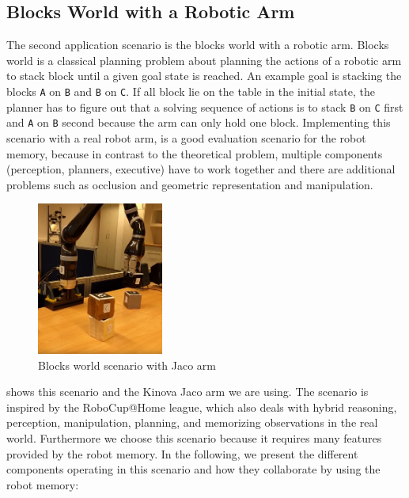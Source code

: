 \subsection{Blocks World with a Robotic Arm}
\label{sec:app-blocks-world}
The second application scenario is the blocks world with a robotic
arm. Blocks world is a classical planning problem about planning the
actions of a robotic arm to stack block until a given goal state is
reached. An example goal is stacking the blocks \texttt{A} on
\texttt{B} and \texttt{B} on \texttt{C}. If all block lie on the table in the initial
state, the planner has to figure out that a solving sequence of
actions is to stack \texttt{B} on \texttt{C} first and \texttt{A} on
\texttt{B} second because the arm can only hold one block.
Implementing this scenario with a real robot arm, is a good evaluation
scenario for the robot memory, because in contrast to the theoretical
problem, multiple components (perception, planners, executive)
have to work together and there are additional problems such as
occlusion and geometric representation and manipulation.
\begin{figure}
  \centering
  \includegraphics[width=0.37\textwidth]{img/blocks-world}%
  \caption[Blocks world scenario with Jaco arm]{Blocks world scenario with Jaco arm}
  \vspace{-4mm}
  \label{fig:blocksworld}
\end{figure}
 shows this scenario and the Kinova Jaco arm
we are using. The scenario is inspired by the RoboCup@Home league,
which also deals with hybrid reasoning, perception, manipulation,
planning, and memorizing observations in the real world. Furthermore
we choose this scenario because it requires many features provided by
the robot memory. In the following, we present the different
components operating in this scenario and how they collaborate by
using the robot memory:
\\
